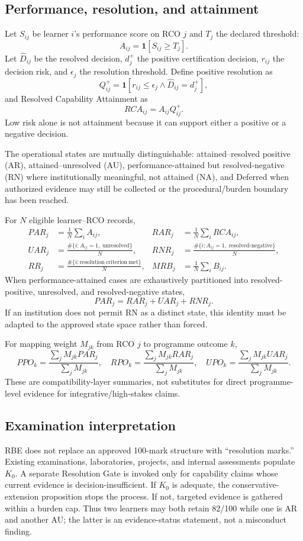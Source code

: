\documentclass[11pt]{article}
\begin{document}
\subsection{Performance, resolution, and attainment}
Let $S_{ij}$ be learner $i$'s performance score on RCO $j$ and $T_j$ the declared threshold:
\[
A_{ij}=\mathbf{1}[S_{ij}\ge T_j].
\]
Let $\widehat D_{ij}$ be the resolved decision, $d_j^+$ the positive certification decision, $r_{ij}$ the decision risk, and $\epsilon_j$ the resolution threshold. Define positive resolution as
\[
Q^+_{ij}=\mathbf{1}[r_{ij}\le\epsilon_j\land \widehat D_{ij}=d_j^+],
\]
and Resolved Capability Attainment as
\[
RCA_{ij}=A_{ij}Q^+_{ij}.
\]
Low risk alone is not attainment because it can support either a positive or a negative decision.

The operational states are mutually distinguishable: attained--resolved positive (AR), attained--unresolved (AU), performance-attained but resolved-negative (RN) where institutionally meaningful, not attained (NA), and Deferred when authorized evidence may still be collected or the procedural/burden boundary has been reached.

For $N$ eligible learner--RCO records,
\begin{align*}
PAR_j&=\frac{1}{N}\sum_i A_{ij}, & RAR_j&=\frac{1}{N}\sum_i RCA_{ij},\\
UAR_j&=\frac{\#\{i:A_{ij}=1,\;\mathrm{unresolved}\}}{N}, & RNR_j&=\frac{\#\{i:A_{ij}=1,\;\mathrm{resolved\text{-}negative}\}}{N},\\
RR_j&=\frac{\#\{i:\mathrm{resolution\ criterion\ met}\}}{N}, & MRB_j&=\frac{1}{N}\sum_i B_{ij}.
\end{align*}
When performance-attained cases are exhaustively partitioned into resolved-positive, unresolved, and resolved-negative states,
\[
PAR_j=RAR_j+UAR_j+RNR_j.
\]
If an institution does not permit RN as a distinct state, this identity must be adapted to the approved state space rather than forced.

For mapping weight $M_{jk}$ from RCO $j$ to programme outcome $k$,
\[
PPO_k=\frac{\sum_jM_{jk}PAR_j}{\sum_jM_{jk}},\quad
RPO_k=\frac{\sum_jM_{jk}RAR_j}{\sum_jM_{jk}},\quad
UPO_k=\frac{\sum_jM_{jk}UAR_j}{\sum_jM_{jk}}.
\]
These are compatibility-layer summaries, not substitutes for direct programme-level evidence for integrative/high-stakes claims.

\subsection{Examination interpretation}
RBE does not replace an approved 100-mark structure with ``resolution marks.'' Existing examinations, laboratories, projects, and internal assessments populate $K_0$. A separate Resolution Gate is invoked only for capability claims whose current evidence is decision-insufficient. If $K_0$ is adequate, the conservative-extension proposition stops the process. If not, targeted evidence is gathered within a burden cap. Thus two learners may both retain 82/100 while one is AR and another AU; the latter is an evidence-status statement, not a misconduct finding.
\end{document}
